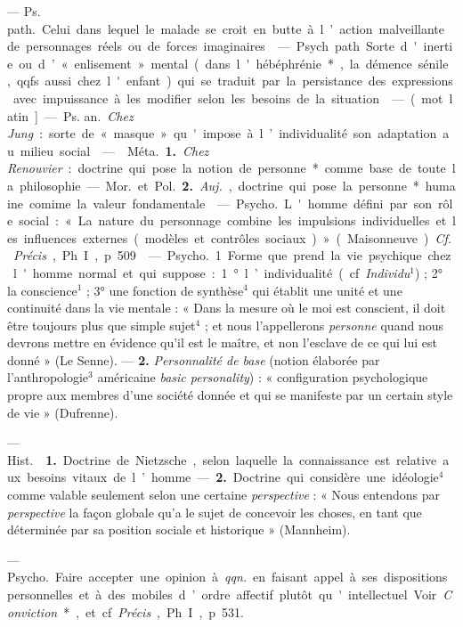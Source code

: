 \begin{itemize}[leftmargin=1cm, label=, itemsep=1pt]
 — \si{Ps. path.} Celui dans lequel le malade se
croit en butte à l’action malveillante de personnages réels ou de forces
imaginaires.

 — Psych. path. Sorte d'inertie ou d’ « enlisement » mental
(dans l'hébéphrénie*, la démence sénile, qqfs. aussi chez l'enfant) qui se
traduit par la persistance des expressions avec impuissance à les modifier
selon les besoins de la situation.

 — (mot latin] — \si{Ps. an.} {\it Chez Jung} : sorte de « masque
» qu'impose à l’individualité son adaptation au milieu social.

 —  \si{Méta.} {\bf 1.} {\it Chez
Renouvier} : doctrine qui pose la notion de personne* comme base de toute la
philosophie. — \si{Mor.} et \si{Pol.}  {\bf 2.} {\it Auj.}, doctrine qui pose
la personne* humaine comime la valeur fondamentale.

 — \si{Psycho.} L'homme défini par son rôle social : « La
nature du personnage combine les impulsions individuelles et les influences
externes (modèles et contrôles sociaux) » (Maisonneuve). {\it Cf.}
{\it Précis}, Ph. I, p. 509.

 — \si{Psycho.} 1. Forme que prend.la vie
psychique chez l'homme normal et qui suppose : 1° l’individualité (cf.
{\it Individu}$^1$) ; 2° la conscience$^1$ ; 3° une fonction de synthèse$^4$
qui établit une unité et une continuité dans la vie mentale : « Dans la
mesure où le moi est conscient, il doit être toujours plus que simple
sujet$^4$ ; et nous l’appellerons {\it personne} quand nous devrons mettre en
évidence qu'il est le maître, et non l’esclave de ce qui lui est donné » (Le
Senne). — {\bf 2.} {\it Personnalité
de base} (notion élaborée par l'anthropologie$^3$ américaine {\it basic
personality}) : « configuration psychologique propre aux membres d’une
société donnée et qui se manifeste par un certain style de vie » (Dufrenne).

 — \si{Hist.}  {\bf 1.} Doctrine de
Nietzsche, selon laquelle la connaissance est relative aux besoins vitaux de
l’homme. — {\bf 2.} Doctrine qui considère une idéologie$^4$ comme valable
seulement selon une certaine {\it perspective} : « Nous entendons par
{\it perspective} la façon globale qu’a le sujet de concevoir les choses, en
tant que déterminée par sa position sociale et historique » (Mannheim).

 — \si{Psycho.} Faire accepter une opinion à {\it qqn.} en
faisant appel à ses dispositions personnelles et à des mobiles d’ordre
affectif plutôt qu'intellectuel. Voir {\it Conviction}*, et cf. {\it Précis},
Ph. I, p. 531.


\end{itemize}
